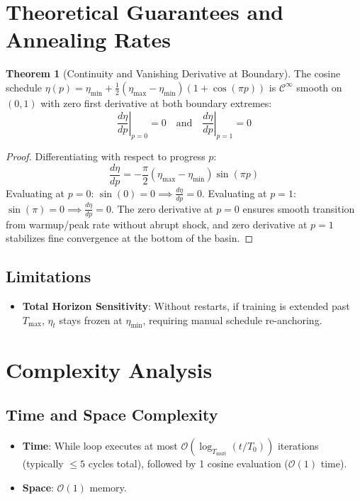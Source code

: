 \documentclass[11pt,a4paper]{article}
\theoremstyle{definition}
\newtheorem{theorem}{Theorem}[section]
\begin{document}
\section{Theoretical Guarantees and Annealing Rates}

\begin{theorem}[Continuity and Vanishing Derivative at Boundary]
The cosine schedule $\eta(p) = \eta_{\min} + \frac{1}{2}(\eta_{\max} - \eta_{\min})(1 + \cos(\pi p))$ is $\mathcal{C}^\infty$ smooth on $(0, 1)$ with zero first derivative at both boundary extremes:
\begin{equation}
\left.\frac{d\eta}{dp}\right|_{p=0} = 0 \quad \text{and} \quad \left.\frac{d\eta}{dp}\right|_{p=1} = 0
\end{equation}
\end{theorem}

\begin{proof}
Differentiating with respect to progress $p$:
\begin{equation}
\frac{d\eta}{dp} = -\frac{\pi}{2} (\eta_{\max} - \eta_{\min}) \sin(\pi p)
\end{equation}
Evaluating at $p=0$: $\sin(0) = 0 \implies \frac{d\eta}{dp} = 0$. Evaluating at $p=1$: $\sin(\pi) = 0 \implies \frac{d\eta}{dp} = 0$.
The zero derivative at $p=0$ ensures smooth transition from warmup/peak rate without abrupt shock, and zero derivative at $p=1$ stabilizes fine convergence at the bottom of the basin.
\end{proof}

\subsection{Limitations}
\begin{itemize}
    \item \textbf{Total Horizon Sensitivity}: Without restarts, if training is extended past $T_{\text{max}}$, $\eta_t$ stays frozen at $\eta_{\min}$, requiring manual schedule re-anchoring.
\end{itemize}

\section{Complexity Analysis}

\subsection{Time and Space Complexity}
\begin{itemize}
    \item \textbf{Time}: While loop executes at most $\mathcal{O}(\log_{T_{\text{mult}}} (t / T_0))$ iterations (typically $\le 5$ cycles total), followed by 1 cosine evaluation ($\mathcal{O}(1)$ time).
    \item \textbf{Space}: $\mathcal{O}(1)$ memory.
\end{itemize}
\end{document}

